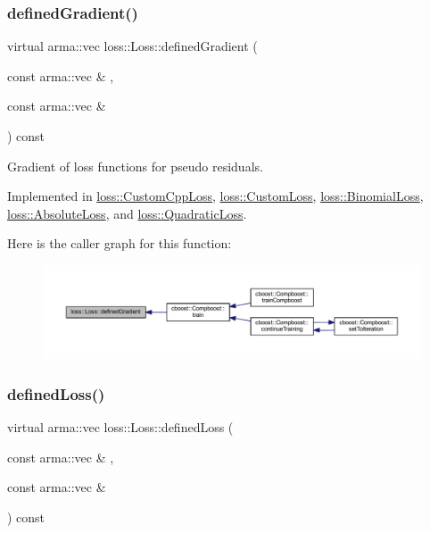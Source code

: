 \subsubsection{\texorpdfstring{defined\+Gradient()}{definedGradient()}}
{\footnotesize\ttfamily virtual arma\+::vec loss\+::\+Loss\+::defined\+Gradient (\begin{DoxyParamCaption}\item[{const arma\+::vec \&}]{,  }\item[{const arma\+::vec \&}]{ }\end{DoxyParamCaption}) const\hspace{0.3cm}{\ttfamily [pure virtual]}}



Gradient of loss functions for pseudo residuals. 



Implemented in \hyperlink{classloss_1_1_custom_cpp_loss_a3ff741b3a4d4c3f3515660dcb7b32781}{loss\+::\+Custom\+Cpp\+Loss}, \hyperlink{classloss_1_1_custom_loss_a3a79dc019e781c2956b52fb8e1cfcc56}{loss\+::\+Custom\+Loss}, \hyperlink{classloss_1_1_binomial_loss_a47a27e1be3e7f2c275046b42557ca21a}{loss\+::\+Binomial\+Loss}, \hyperlink{classloss_1_1_absolute_loss_a1886fc8ca065c6f0a207b7a8a0f8444d}{loss\+::\+Absolute\+Loss}, and \hyperlink{classloss_1_1_quadratic_loss_adb4da1acbad702b5ba8570abaa17d373}{loss\+::\+Quadratic\+Loss}.

Here is the caller graph for this function\+:\nopagebreak
\begin{figure}[H]
\begin{center}
\leavevmode
\includegraphics[width=350pt]{classloss_1_1_loss_a267a4de70747ade4b2d84ce35a448979_icgraph}
\end{center}
\end{figure}
\mbox{\label{classloss_1_1_loss_ae9f94dd9b8311397583ba3a9cb485e94}} 
\subsubsection{\texorpdfstring{defined\+Loss()}{definedLoss()}}
{\footnotesize\ttfamily virtual arma\+::vec loss\+::\+Loss\+::defined\+Loss (\begin{DoxyParamCaption}\item[{const arma\+::vec \&}]{,  }\item[{const arma\+::vec \&}]{ }\end{DoxyParamCaption}) const\hspace{0.3cm}{\ttfamily [pure virtual]}}



